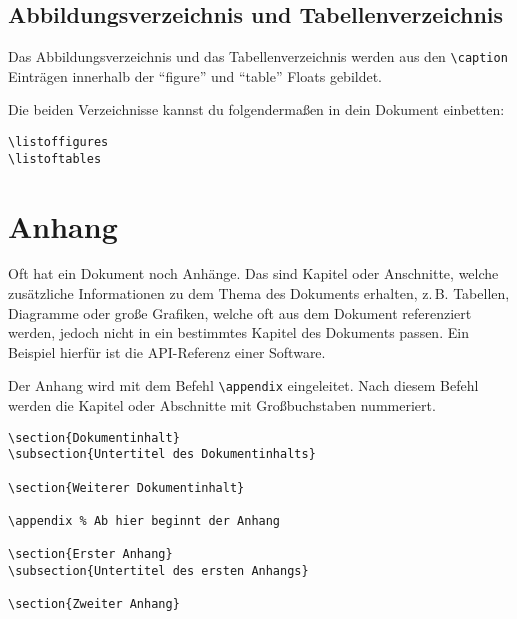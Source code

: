 \subsection{Abbildungsverzeichnis und Tabellenverzeichnis}

Das Abbildungsverzeichnis und das Tabellenverzeichnis werden aus den \texttt{\textbackslash caption} Einträgen innerhalb der \enquote{figure} und \enquote{table} Floats gebildet. 

Die beiden Verzeichnisse kannst du folgendermaßen in dein Dokument einbetten:
\begin{lstlisting}
\listoffigures
\listoftables
\end{lstlisting}


\section{Anhang}

Oft hat ein Dokument noch Anhänge. Das sind Kapitel oder Anschnitte, welche zusätzliche Informationen zu dem Thema des Dokuments erhalten, z.\,B. Tabellen, Diagramme oder große Grafiken, welche oft aus dem Dokument referenziert werden, jedoch nicht in ein bestimmtes Kapitel des Dokuments passen. Ein Beispiel hierfür ist die API-Referenz einer Software.

Der Anhang wird mit dem Befehl \texttt{\textbackslash appendix} eingeleitet. Nach diesem Befehl werden die Kapitel oder Abschnitte mit Großbuchstaben nummeriert.
\begin{lstlisting}[frame=tb, caption=Dokumentstruktur mit Anhang]
\section{Dokumentinhalt}
\subsection{Untertitel des Dokumentinhalts}

\section{Weiterer Dokumentinhalt}

\appendix % Ab hier beginnt der Anhang

\section{Erster Anhang}
\subsection{Untertitel des ersten Anhangs}

\section{Zweiter Anhang}

\end{lstlisting}


